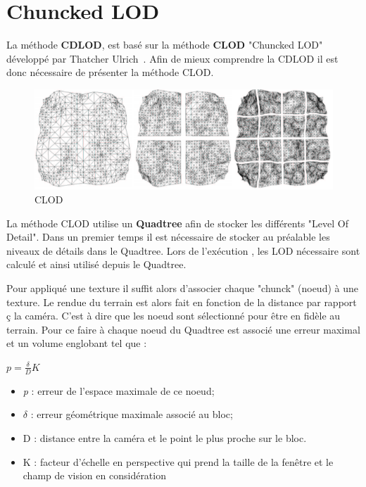   
\vspace{1.5cm}
  \section{Chuncked LOD}
  
  La méthode \textbf{CDLOD}, est basé sur la méthode \textbf{CLOD} "Chuncked LOD" développé par Thatcher Ulrich~\cite{CLOD}.
  Afin de mieux comprendre la CDLOD il est donc nécessaire de présenter la méthode CLOD.

\begin{figure}[!ht]
    \includegraphics[width=12cm]{img/clod.png}
    \caption[CLOD]{CLOD\protect\footnotemark}
    \label{fig:clod}
\end{figure}


  La méthode CLOD utilise un \textbf{Quadtree} afin de stocker les différents "Level Of Detail". Dans un premier temps il est nécessaire de stocker au préalable les niveaux de détails dans le Quadtree. Lors de l'exécution , les LOD nécessaire sont calculé et ainsi utilisé depuis le Quadtree. 
  
  Pour appliqué une texture il suffit alors d'associer chaque "chunck" (noeud) à une texture.
  Le rendue du terrain est alors fait en fonction de la distance par rapport ç la caméra. C'est à dire que les noeud sont sélectionné pour être en fidèle au terrain. Pour ce faire à chaque noeud du Quadtree est associé une erreur maximal et un volume englobant tel que :
  
  {\Large
\begin{center}
  \begin{math}
  p=\frac{\delta}{D}K
  \end{math}
 \end{center}
 }
 
 \begin{itemize}
\item \emph{p} : erreur de l'espace maximale de ce noeud;
\item \begin{math}\delta\end{math} : erreur géométrique maximale associé au bloc;
\item D : distance entre la caméra et le point le plus proche sur le bloc.
\item K : facteur d'échelle en perspective qui prend la taille de la fenêtre et le champ de vision en considération
\end{itemize}
  
